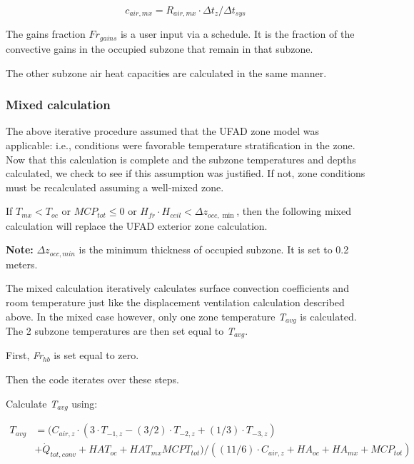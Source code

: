 \begin{equation}
{c_{air,mx}} = {R_{air,mx}} \cdot \Delta {t_z}/\Delta {t_{sys}}
\end{equation}

The gains fraction \(F{r_{gains}}\) is a user input via a schedule. It is the fraction of the convective gains in the occupied subzone that remain in that subzone.

The other subzone air heat capacities are calculated in the same manner.

\subsubsection{Mixed calculation}\label{mixed-calculation-2}

The above iterative procedure assumed that the UFAD zone model was applicable: i.e., conditions were favorable temperature stratification in the zone. Now that this calculation is complete and the subzone temperatures and depths calculated, we check to see if this assumption was justified. If not, zone conditions must be recalculated assuming a well-mixed zone.

If \({T_{mx}} < {T_{oc}}\) or \(MC{P_{tot}} \le 0\) or \({H_{fr}} \cdot {H_{ceil}} < \Delta {z_{occ,\min }}\), then the following mixed calculation will replace the UFAD exterior zone calculation.

\textbf{Note:} \(\Delta {z_{occ,min}}\) is the minimum thickness of occupied subzone. It is set to 0.2 meters.

The mixed calculation iteratively calculates surface convection coefficients and room temperature just like the displacement ventilation calculation described above. In the mixed case however, only one zone temperature \emph{T\(_{avg}\)} is calculated. The 2 subzone temperatures are then set equal to \emph{T\(_{avg}\)}.

First, \emph{Fr\(_{hb}\)} is set equal to zero.

Then the code iterates over these steps.

Calculate \emph{T\(_{avg}\)} using:

\begin{equation}
  \begin{array}{rl}
    T_{avg} &= ({C_{air,z}} \cdot (3 \cdot {T_{ - 1,z}} - (3/2) \cdot {T_{ - 2,z}} + (1/3) \cdot {T_{ - 3,z}}) \\
            &+ {{\dot Q}_{tot,conv}} + HA{T_{oc}} + HA{T_{mx}}MCP{T_{tot}})/((11/6) \cdot {C_{air,z}} + H{A_{oc}} + H{A_{mx}} + MC{P_{tot}})
  \end{array}
\end{equation}

